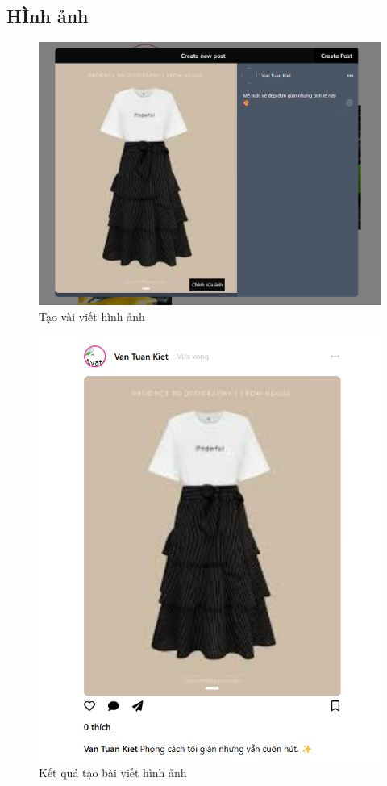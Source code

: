 \subsection{HÌnh ảnh}

\begin{figure}[H]
    \centering
    \includegraphics[width=1\textwidth]{img/instagram/bai_viet_hinh_anh.png}
    \caption{Tạo vài viết hình ảnh}
\end{figure}

\FloatBarrier %



\begin{figure}[H]
    \centering
    \includegraphics[width=1\textwidth]{img/instagram/bai_viet_hinh_anh_2.png}
    \caption{Kết quả tạo bài viết hình ảnh}
\end{figure}


